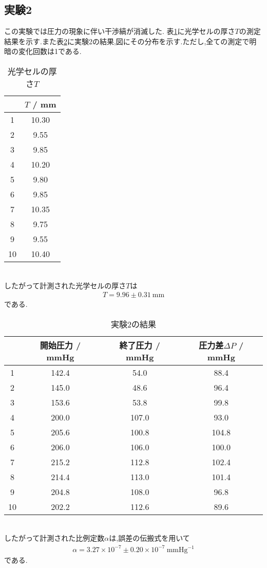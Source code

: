 \subsection{実験2}
\label{sec:res_2}
この実験では圧力の現象に伴い干渉縞が消滅した.
表\ref{tab:res_cell}に光学セルの厚さ$T$の測定結果を示す.また表\ref{tab:res_2}に実験2の結果,図にその分布を示す.ただし,全ての測定で明暗の変化回数は1である.
\begin{table}[htbp]
   \caption{光学セルの厚さ$T$}
   \label{tab:res_cell}
   \centering
   \begin{tabular}{c|c}
     \hline
     &$T$ / \si{\milli\metre}\\
     \hline \hline
     1 & 10.30 \\
2 & 9.55 \\
3 & 9.85 \\
4 & 10.20 \\
5 & 9.80 \\
6 & 9.85 \\
7 & 10.35 \\
8 & 9.75 \\
9 & 9.55 \\
10 & 10.40 \\
     \hline
   \end{tabular}
\end{table}\\
したがって計測された光学セルの厚さ$T$は
\begin{align*}
  T=9.96\pm0.31~\si{\milli\metre}
\end{align*}
である.
\begin{table}[htbp]
   \caption{実験2の結果}
   \label{tab:res_2}
   \centering
   \begin{tabular}{c|ccc}
     \hline
     &開始圧力 / \si{\mmHg}&終了圧力 / \si{\mmHg}&圧力差$\Delta P$ / \si{\mmHg}\\
     \hline \hline
     1 & 142.4 & 54.0 & 88.4 \\
2 & 145.0 & 48.6 & 96.4 \\
3 & 153.6 & 53.8 & 99.8 \\
4 & 200.0 & 107.0 & 93.0 \\
5 & 205.6 & 100.8 & 104.8 \\
6 & 206.0 & 106.0 & 100.0 \\
7 & 215.2 & 112.8 & 102.4 \\
8 & 214.4 & 113.0 & 101.4 \\
9 & 204.8 & 108.0 & 96.8 \\
10 & 202.2 & 112.6 & 89.6 \\
     \hline
   \end{tabular}
\end{table}\\
したがって計測された比例定数$\alpha$は,誤差の伝搬式を用いて
\begin{align*}
  \alpha=3.27\times10^{-7}\pm0.20\times10^{-7}~\si{\mmHg^{-1}}
\end{align*}
である.